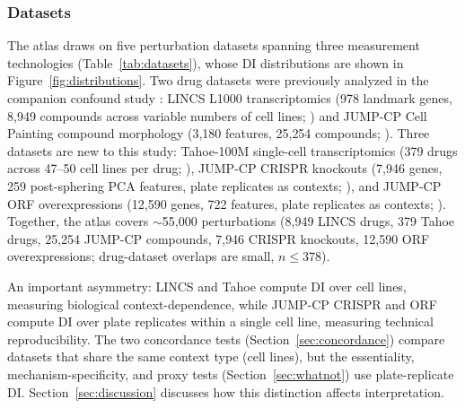 \documentclass[11pt]{article}
\begin{document}
\subsubsection*{Datasets}

The atlas draws on five perturbation datasets spanning three measurement
technologies (Table~\ref{tab:datasets}), whose DI distributions are shown in
Figure~\ref{fig:distributions}.  Two drug datasets were
previously analyzed in the companion confound study
\citep{tower2026confound}: LINCS L1000 transcriptomics (978 landmark
genes, 8{,}949 compounds across variable numbers of cell lines;
\citealp{subramanian2017next}) and JUMP-CP Cell Painting compound
morphology (3{,}180 features, 25{,}254 compounds;
\citealp{chandrasekaran2024cpjump1}).  Three datasets are new to this
study: Tahoe-100M single-cell transcriptomics (379 drugs across 47--50
cell lines per drug; \citealp{tahoe2025}), JUMP-CP CRISPR knockouts
(7{,}946 genes, 259 post-sphering PCA features, plate replicates as
contexts; \citealp{chandrasekaran2025morphmap}), and JUMP-CP ORF
overexpressions (12{,}590 genes, 722 features, plate replicates as
contexts; \citealp{chandrasekaran2025morphmap}).
Together, the atlas covers ${\sim}$55{,}000 perturbations (8{,}949
LINCS drugs, 379 Tahoe drugs, 25{,}254 JUMP-CP compounds, 7{,}946
CRISPR knockouts, 12{,}590 ORF overexpressions; drug-dataset overlaps
are small, $n \leq 378$).

An important asymmetry: LINCS and Tahoe compute DI over cell lines,
measuring biological context-dependence, while JUMP-CP CRISPR and ORF
compute DI over plate replicates within a single cell line, measuring
technical reproducibility.  The two concordance tests
(Section~\ref{sec:concordance}) compare datasets that share the same
context type (cell lines), but the essentiality, mechanism-specificity,
and proxy tests (Section~\ref{sec:whatnot}) use plate-replicate DI.
Section~\ref{sec:discussion} discusses how this distinction affects
interpretation.
\end{document}
